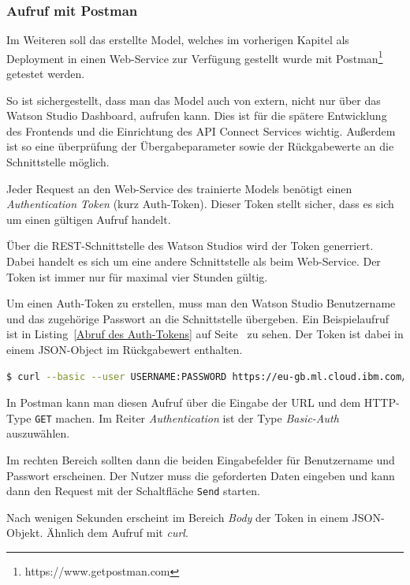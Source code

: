 \subsubsection{Aufruf mit Postman}
\label{subsec:Aufruf mit Postman}
Im Weiteren soll das erstellte Model, welches im vorherigen Kapitel als Deployment in einen Web-Service zur Verfügung
gestellt wurde mit Postman\footnote{https://www.getpostman.com} getestet werden.

So ist sichergestellt, dass man das Model auch von extern, nicht nur über das Watson Studio Dashboard, aufrufen kann.
Dies ist für die spätere Entwicklung des Frontends und die Einrichtung des API Connect Services wichtig. Außerdem ist
so eine überprüfung der Übergabeparameter sowie der Rückgabewerte an die Schnittstelle möglich.

Jeder Request an den Web-Service des trainierte Models benötigt einen \textit{Authentication Token} (kurz Auth-Token).
Dieser Token stellt sicher, dass es sich um einen gültigen Aufruf handelt.

Über die REST-Schnittstelle des Watson Studios wird der Token generriert. Dabei handelt es sich um eine andere
Schnittstelle als beim Web-Service. Der Token ist immer nur für maximal vier Stunden gültig.

Um einen Auth-Token zu erstellen, muss man den Watson Studio Benutzername und das zugehörige Passwort an die Schnittstelle
übergeben. Ein Beispielaufruf ist in Listing~\ref{Abruf des Auth-Tokens} auf Seite~\pageref{Abruf des Auth-Tokens}
zu sehen. Der Token ist dabei in einem JSON-Object im Rückgabewert enthalten.

\begin{lstlisting}[language=bash, caption=Abruf des Auth-Tokens, label=Abruf des Auth-Tokens]
$ curl --basic --user USERNAME:PASSWORD https://eu-gb.ml.cloud.ibm.com/v3/identity/token
\end{lstlisting}

In Postman kann man diesen Aufruf über die Eingabe der URL und dem HTTP-Type \texttt{GET} machen. Im Reiter
\textit{Authentication} ist der Type \textit{Basic-Auth} auszuwählen.

Im rechten Bereich sollten dann die beiden Eingabefelder für Benutzername und Passwort erscheinen. Der Nutzer muss die
geforderten Daten eingeben und kann dann den Request mit der Schaltfläche \texttt{Send} starten.

Nach wenigen Sekunden erscheint im Bereich \textit{Body} der Token in einem JSON-Objekt. Ähnlich dem Aufruf mit \textit{curl}.

